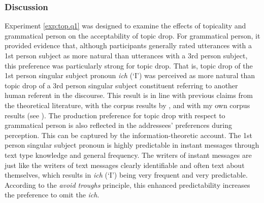 \subsubsection{Discussion}\label{sec:exp.top.q1.diss.person}
Experiment \ref*{exp:top.q1} was designed to examine the effects of topicality and grammatical person on the acceptability of topic drop.
For grammatical person, it provided evidence that, although participants generally rated utterances with a 1st person subject as more natural than utterances with a 3rd person subject, this preference was particularly strong for topic drop.
That is, topic drop of the 1st person singular subject pronoun \textit{ich} (`I') was perceived as more natural than topic drop of a 3rd person singular subject constituent referring to another human referent in the discourse.
This result is in line with previous claims from the theoretical literature, with the corpus results by \citet{auer1993, androutsopoulos.schmidt2002, frick2017}, and with my own corpus results (see ).
The production preference for topic drop with respect to grammatical person is also reflected in the addressees' preferences during perception.
This can be captured by the information-theoretic account.  
The 1st person singular subject pronoun is highly predictable  in instant messages through text type knowledge and general frequency.
The writers of instant messages are just like the writers of text messages clearly identifiable and often text about themselves, which results in \textit{ich} (`I') being very frequent and very predictable.
According to the \textit{avoid troughs} principle, this enhanced predictability increases the preference to omit the \textit{ich}.

